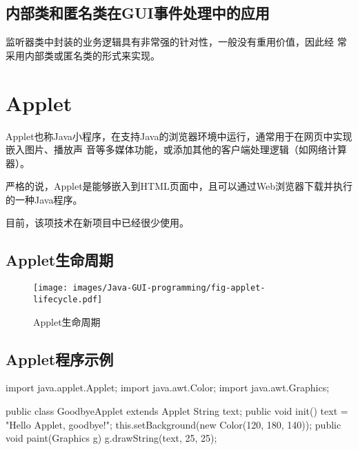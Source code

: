 \subsection{内部类和匿名类在GUI事件处理中的应用}

监听器类中封装的业务逻辑具有非常强的针对性，一般没有重用价值，因此经
常采用内部类或匿名类的形式来实现。


  

\section{Applet}

Applet也称Java小程序，在支持Java的浏览器环境中运行，通常用于在网页中实现嵌入图片、播放声
音等多媒体功能，或添加其他的客户端处理逻辑（如网络计算器）。

{\hei 严格的说，Applet是能够嵌入到HTML页面中，且可以通过Web浏览器下载并执行的一种Java程序。}

目前，该项技术在新项目中已经很少使用。

\subsection{Applet生命周期}

\begin{figure}[htb]
\centering
\texttt{[image: images/Java-GUI-programming/fig-applet-lifecycle.pdf]}
\caption{Applet生命周期}
\label{fig:fig-applet-lifecycle}
\end{figure}

\subsection{Applet程序示例}


\begin{javaCode}
  import java.applet.Applet;
  import java.awt.Color;
  import java.awt.Graphics;

  public class GoodbyeApplet extends Applet {
    String text;
    public void init() {
      text = "Hello Applet, goodbye!";
      this.setBackground(new Color(120, 180, 140));
    }
    public void paint(Graphics g) {
      g.drawString(text, 25, 25);
    }
  }
\end{javaCode}


